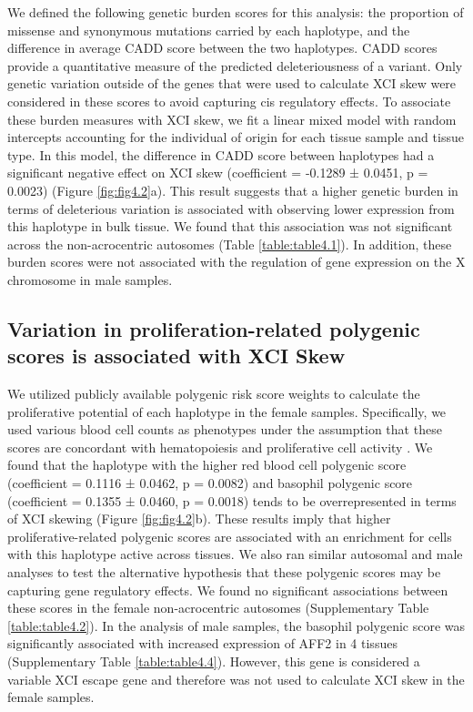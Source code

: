 We defined the following genetic burden scores for this analysis: the proportion of missense and synonymous mutations carried by each haplotype, and the difference in average CADD score \cite{Rentzsch2019-pk} between the two haplotypes. CADD scores provide a quantitative measure of the predicted deleteriousness of a variant. Only genetic variation outside of the genes that were used to calculate XCI skew were considered in these scores to avoid capturing cis regulatory effects. To associate these burden measures with XCI skew, we fit a linear mixed model with random intercepts accounting for the individual of origin for each tissue sample and tissue type. In this model, the difference in CADD score between haplotypes had a significant negative effect on XCI skew (coefficient = -0.1289 ± 0.0451, p = 0.0023) (Figure \ref{fig:fig4.2}a). This result suggests that a higher genetic burden in terms of deleterious variation is associated with observing lower expression from this haplotype in bulk tissue. We found that this association was not significant across the non-acrocentric autosomes (Table \ref{table:table4.1}). In addition, these burden scores were not associated with the regulation of gene expression on the X chromosome in male samples. 




\subsection{Variation in proliferation-related polygenic scores is associated with XCI Skew}

We utilized publicly available polygenic risk score weights to calculate the proliferative potential of each haplotype in the female samples. Specifically, we used various blood cell counts as phenotypes under the assumption that these scores are concordant with hematopoiesis and proliferative cell activity \cite{Loh2020-mb}. We found that the haplotype with the higher red blood cell polygenic score (coefficient = 0.1116 ± 0.0462, p = 0.0082) and basophil polygenic score (coefficient = 0.1355 ± 0.0460, p = 0.0018) tends to be overrepresented in terms of XCI skewing (Figure \ref{fig:fig4.2}b). These results imply that higher proliferative-related polygenic scores are associated with an enrichment for cells with this haplotype active across tissues. We also ran similar autosomal and male analyses to test the alternative hypothesis that these polygenic scores may be capturing gene regulatory effects. We found no significant associations between these scores in the female non-acrocentric autosomes (Supplementary Table \ref{table:table4.2}). In the analysis of male samples, the basophil polygenic score was significantly associated with increased expression of AFF2 in 4 tissues (Supplementary Table \ref{table:table4.4}). However, this gene is considered a variable XCI escape gene and therefore was not used to calculate XCI skew in the female samples.

